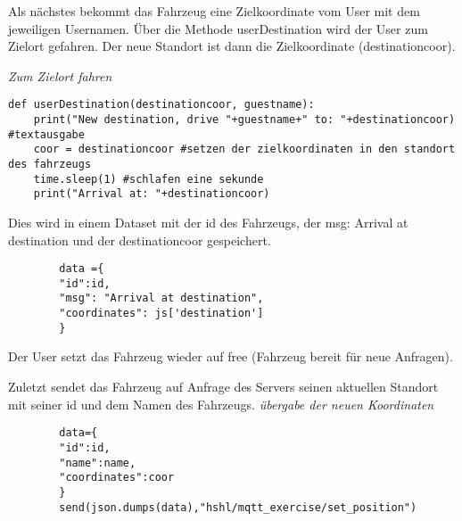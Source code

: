 Als nächstes bekommt das Fahrzeug eine Zielkoordinate vom User mit dem jeweiligen Usernamen.
Über die Methode userDestination wird der User zum Zielort gefahren. Der neue Standort ist dann die Zielkoordinate (destinationcoor).


\textit{Zum Zielort fahren}
\begin{lstlisting}
def userDestination(destinationcoor, guestname):
    print("New destination, drive "+guestname+" to: "+destinationcoor) #textausgabe
    coor = destinationcoor #setzen der zielkoordinaten in den standort des fahrzeugs
    time.sleep(1) #schlafen eine sekunde
    print("Arrival at: "+destinationcoor)
\end{lstlisting}

Dies wird in einem Dataset mit der id des Fahrzeugs, der msg: Arrival at destination und der destinationcoor gespeichert.

\begin{lstlisting}
        data ={
        "id":id,
        "msg": "Arrival at destination",
        "coordinates": js['destination']
        }
\end{lstlisting}
Der User setzt das Fahrzeug wieder auf free (Fahrzeug bereit für neue Anfragen).


Zuletzt sendet das Fahrzeug auf Anfrage des Servers seinen aktuellen Standort mit seiner id und dem Namen des Fahrzeugs. 
\textit{übergabe der neuen Koordinaten}
\begin{lstlisting}
        data={
        "id":id,
        "name":name,
        "coordinates":coor
        }
        send(json.dumps(data),"hshl/mqtt_exercise/set_position")

\end{lstlisting}




















